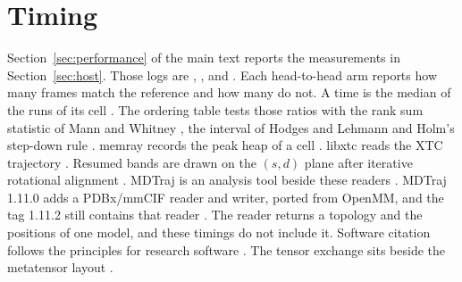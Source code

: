 \documentclass[preprint,12pt]{elsarticle}
\begin{document}
\FloatBarrier \section{Timing}\label{sec:supp-timing}
Section~\ref{sec:performance} of the main text reports the measurements in Section~\ref{sec:host}.
Those logs are , ,  and .
Each head-to-head arm reports how many frames match the reference and how many do not.
A time is the median of the runs of its cell \cite{hoeflerScientificBenchmarkingParallel2015,kaliberaRigorousBenchmarkingReasonable2013}.
The ordering table tests those ratios with the rank sum statistic of Mann and Whitney \cite{mannTestWhetherOne1947}, the interval of Hodges and Lehmann \cite{hollanderNonparametricStatisticalMethods2014} and Holm's step-down rule \cite{holmSimpleSequentiallyRejective1979}.
memray records the peak heap of a cell \cite{memrayBloomberg}.
libxtc reads the XTC trajectory \cite{krylovLibxtcEfficientLibrary2021}.
Resumed bands are drawn on the $(s, d)$ plane \cite{goswamiTwodimensionalRmsdProjections2026} after iterative rotational alignment \cite{gundeIRAShapeMatching2021}.
MDTraj is an analysis tool beside these readers \cite{mcgibbonMdtrajModernOpen2015}.
MDTraj 1.11.0 adds a PDBx/mmCIF reader and writer, ported from OpenMM, and the tag 1.11.2 still contains that reader \cite{mdtrajRelease11102025}.
The reader returns a topology and the positions of one model, and these timings do not include it.
Software citation follows the principles for research software \cite{smithSoftwareCitationPrinciples2016}.
The tensor exchange sits beside the metatensor layout \cite{bigiMetatensorMetatomicFoundational2026}.
\end{document}
